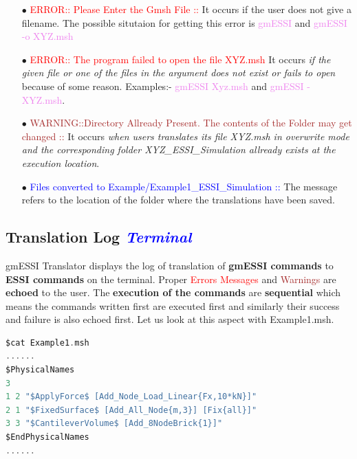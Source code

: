 \documentclass[11pt]{article}
\begin{document}
    \begin{itemize}

      \item[$\bullet$] \textcolor{red}{ERROR:: Please Enter the Gmsh File ::}
        It occurs if the user does not give a filename. The possible situtaion
        for getting this error is \textcolor{violet}{gmESSI} and
        \textcolor{violet}{gmESSI -o XYZ.msh}

      \item[$\bullet$] \textcolor{red}{ERROR:: The program failed to open the
        file XYZ.msh } It occurs \textit{if the given file or one of the files
        in the argument does not exist or fails to open} because of some
        reason. Examples:- \textcolor{violet}{gmESSI Xyz.msh} and
        \textcolor{violet}{gmESSI - XYZ.msh}.

      \item[$\bullet$] \textcolor{brown}{WARNING::Directory Allready Present.
        The contents of the Folder may get changed ::} It occurs \textit{when
        users translates its file XYZ.msh in overwrite mode and the
        corresponding folder XYZ\_ESSI\_Simulation allready exists at the
        execution location}.

      \item[$\bullet$] \textcolor{blue}{Files converted to
        Example/Example1\_ESSI\_Simulation :: } The message refers to the
        location of the folder where the translations have been saved.

    \end{itemize}

\subsection{Translation Log \textcolor{blue}{\textit{Terminal}}}


gmESSI Translator displays the log of translation of \textbf{gmESSI
commands} to \textbf{ESSI commands} on the terminal. Proper
\textcolor{red}{Errors Messages} and \textcolor{brown}{Warnings} are
\textbf{echoed} to the user. The \textbf{execution of the commands} are
\textbf{sequential} which means the commands written first are executed
first and similarly their success and failure is also echoed first. Let us
look at this aspect with Example1.msh.

\begin{lstlisting}[language=C]
$cat Example1.msh
......
$PhysicalNames
3
1 2 "$ApplyForce$ [Add_Node_Load_Linear{Fx,10*kN}]"
2 1 "$FixedSurface$ [Add_All_Node{m,3}] [Fix{all}]"
3 3 "$CantileverVolume$ [Add_8NodeBrick{1}]"
$EndPhysicalNames
......
\end{lstlisting}
\end{document}
